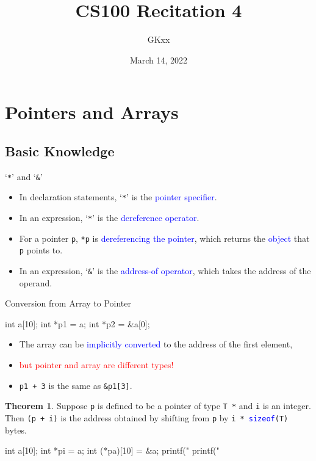\documentclass[handout]{beamer}
\title{CS100 Recitation 4}
\author{GKxx}
\date{March 14, 2022}
\newcommand{\red}[1]{\textcolor{red}{#1}}
\newcommand{\blue}[1]{\textcolor{blue}{#1}}
\newcommand{\ttt}[1]{\texttt{#1}}
\newcommand{\bluett}[1]{\blue{\ttt{#1}}}
\theoremstyle{definition}
\newtheorem{thm}{Theorem}
\begin{document}
\begin{frame}
    \titlepage
\end{frame}


\section{Pointers and Arrays}

\subsection{Basic Knowledge}

\begin{frame}{`\ttt{*}' and `\ttt{\&}'}
    \begin{itemize}
        \item In declaration statements, `\ttt{*}' is the \blue{pointer specifier}.
        \item In an expression, `\ttt{*}' is the \blue{dereference operator}.
        \item For a pointer \ttt{p}, \ttt{*p} is \blue{dereferencing the pointer}, which returns the \blue{object} that \ttt{p} points to.
        \item In an expression, `\ttt{\&}' is the \blue{address-of operator}, which takes the address of the operand.
    \end{itemize}
\end{frame}

\begin{frame}[fragile]{Conversion from Array to Pointer}
    \begin{cpp}
int a[10];
int *p1 = a;
int *p2 = &a[0];
    \end{cpp}
    \begin{itemize}
        \item The array can be \blue{implicitly converted} to the address of the first element,
        \item \red{but pointer and array are different types!}
        \pause
        \item \ttt{p1 + 3} is the same as \ttt{\&p1[3]}.
    \end{itemize}
\end{frame}

\begin{frame}[fragile]
    \begin{thm}
        Suppose \ttt{p} is defined to be a pointer of type \ttt{T *} and \ttt{i} is an integer. Then \ttt{(p + i)} is the address obtained by shifting from \ttt{p} by \ttt{i * }\bluett{sizeof}\ttt{(T)} bytes.
    \end{thm}
    \pause
    \begin{cpp}
int a[10];
int *pi = a;
int (*pa)[10] = &a;
printf("%
printf("%
    \end{cpp}
\end{frame}
\end{document}
